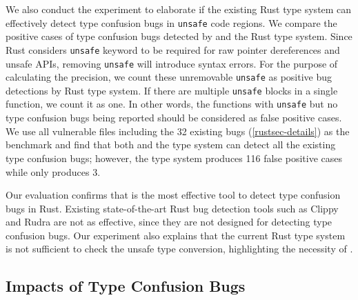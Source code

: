 \vspace{0.05in}
{
We also conduct the experiment to elaborate if  
the existing Rust type system can effectively detect type confusion bugs in \texttt{unsafe} code regions.
%
We compare the positive cases of type confusion bugs detected by \TN and the Rust type system.
%
Since Rust considers \texttt{unsafe} keyword to be required for raw pointer dereferences and unsafe APIs, removing \texttt{unsafe} will introduce syntax errors.
%
For the purpose of calculating the precision, we count these unremovable \texttt{unsafe} as positive bug detections by Rust type system.
%
If there are multiple \texttt{unsafe} blocks in a single function, we count it as one. In other words, the functions with \texttt{unsafe} but no type confusion bugs being reported should be considered as false positive cases.
%
%
We use all vulnerable files including the 32 existing bugs (\autoref{rustsec-details}) 
as the benchmark and find that both \TN and the type system can detect all the existing type confusion bugs; however, the type system produces 116 false positive cases while \TN only produces 3.}

Our evaluation confirms that \TN is the most effective tool to detect type confusion bugs in Rust. 
Existing state-of-the-art Rust bug detection tools such as Clippy and Rudra are not as effective,
since they are not designed for detecting type confusion bugs.  
Our experiment also explains that the current Rust type system is not sufficient to check the unsafe type conversion, highlighting the necessity of \TN.



\subsection{Impacts of Type Confusion Bugs} \label{evaluation:sec-impacts}


